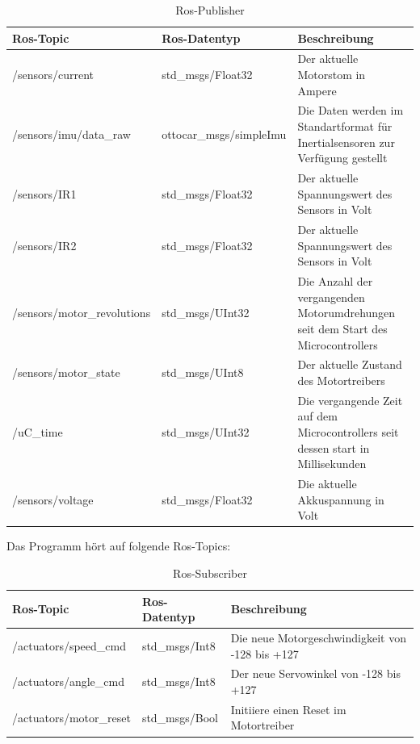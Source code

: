 \begin{table}[H]
  \centering
  \begin{tabularx}{\textwidth}{|X|l|X|}
    \hline
     Ros-Topic 			& Ros-Datentyp		 	& Beschreibung 	\\ \hline \hline
    /sensors/current		& std\_msgs/Float32		& Der aktuelle Motorstom in Ampere								\\ \hline
    /sensors/imu/data\_raw	& ottocar\_msgs/simpleImu	& Die Daten werden im Standartformat für Inertialsensoren zur Verfügung gestellt		\\ \hline
    /sensors/IR1		& std\_msgs/Float32		& Der aktuelle Spannungswert des Sensors in Volt						\\ \hline
    /sensors/IR2		& std\_msgs/Float32		& Der aktuelle Spannungswert des Sensors in Volt						\\ \hline
    /sensors/motor\_revolutions	& std\_msgs/UInt32		& Die Anzahl der vergangenden Motorumdrehungen seit dem Start des Microcontrollers		\\ \hline
    /sensors/motor\_state	& std\_msgs/UInt8		& Der aktuelle Zustand des Motortreibers							\\ \hline
    /uC\_time			& std\_msgs/UInt32		& Die vergangende Zeit auf dem Microcontrollers seit dessen start in Millisekunden		\\ \hline
    /sensors/voltage		& std\_msgs/Float32		& Die aktuelle Akkuspannung in Volt								\\ \hline

  \end{tabularx}
  \caption{Ros-Publisher}%
  \label{tab:ros-pub}
\end{table}


 Das Programm hört auf folgende Ros-Topics:\\

\begin{table}[H]
  \centering
  \begin{tabularx}{\textwidth}{|X|l|X|}
    \hline
     Ros-Topic 			& Ros-Datentyp		 	& Beschreibung 	\\ \hline \hline
    /actuators/speed\_cmd		& std\_msgs/Int8		& Die neue Motorgeschwindigkeit von -128 bis +127		\\ \hline
    /actuators/angle\_cmd		& std\_msgs/Int8		& Der neue Servowinkel von -128 bis +127			\\ \hline
    /actuators/motor\_reset		& std\_msgs/Bool		& Initiiere einen Reset im Motortreiber				\\ \hline
  \end{tabularx}
  \caption{Ros-Subscriber}%
  \label{tab:ros-sub}
\end{table}



